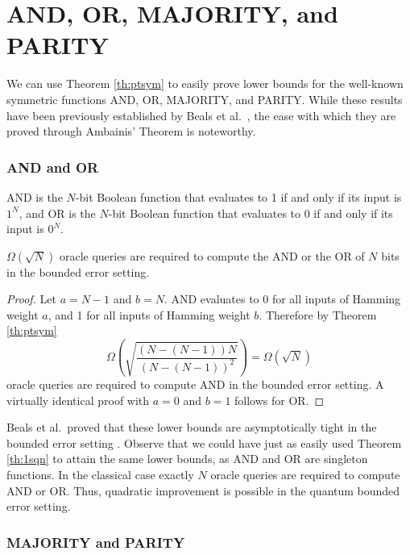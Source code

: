 \section{AND, OR, MAJORITY, and PARITY}
\label{sec:AOMP}

We can use Theorem \ref{th:ptsym} to easily prove lower bounds for the
well-known symmetric functions AND, OR, MAJORITY, and PARITY.  While
these results have been previously established by Beals et al.\
\cite{beals98quantum}, the ease with which they are proved through
Ambainis' Theorem is noteworthy.

\subsubsection{AND and OR}

AND is the $N$-bit Boolean function that evaluates to 1 if and only if
its input is $1^{N}$, and OR is the $N$-bit Boolean function that
evaluates to 0 if and only if its input is $0^{N}$.

\begin{theorem}
\label{th:AND}
$\Omega(\sqrt{N})$ oracle queries are required to compute
the AND or the OR of $N$ bits in the bounded error setting.
\end{theorem}

\begin{proof}
Let $a = N-1$ and $b = N$.  AND evaluates to 0 for all inputs of
Hamming weight $a$, and 1 for all inputs of Hamming weight $b$.
Therefore by Theorem \ref{th:ptsym}
\[\Omega\left(\sqrt{\frac{(N
- (N-1))N}{(N-(N-1))^{2}}}\right) =
\Omega\left(\sqrt{N}\right)\]
oracle queries are required to compute AND in the bounded error
setting.  A virtually identical proof with $a = 0$ and $b = 1$ follows
for OR.
\end{proof}

Beals et al.\ proved that these lower bounds are asymptotically tight
in the bounded error setting \cite{beals98quantum}.  Observe that we
could have just as easily used Theorem \ref{th:1sqn} to attain the
same lower bounds, as AND and OR are singleton functions.  In the
classical case exactly $N$ oracle queries are required to compute AND
or OR.  Thus, quadratic improvement is possible in the quantum bounded
error setting.  

\subsubsection{MAJORITY and PARITY}

